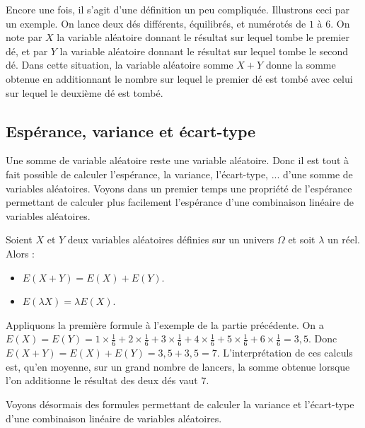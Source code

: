 	\begin{tip}[Exemple]
		Encore une fois, il s'agit d'une définition un peu compliquée. Illustrons ceci par un exemple.
		\newpar
		On lance deux dés différents, équilibrés, et numérotés de $1$ à $6$. On note par $X$ la variable aléatoire donnant le résultat sur lequel tombe le premier dé, et par $Y$ la variable aléatoire donnant le résultat sur lequel tombe le second dé.
		\newpar
		Dans cette situation, la variable aléatoire somme $X + Y$ donne la somme obtenue en additionnant le nombre sur lequel le premier dé est tombé avec celui sur lequel le deuxième dé est tombé.
	\end{tip}

	\subsection{Espérance, variance et écart-type}

	Une somme de variable aléatoire reste une variable aléatoire. Donc il est tout à fait possible de calculer l'espérance, la variance, l'écart-type, ... d'une somme de variables aléatoires.
	\newpar
	Voyons dans un premier temps une propriété de l'espérance permettant de calculer plus facilement l'espérance d'une combinaison linéaire de variables aléatoires.

	\begin{formula}
		Soient $X$ et $Y$ deux variables aléatoires définies sur un univers $\Omega$ et soit $\lambda$ un réel. Alors :
		\begin{itemize}
			\item $E(X + Y) = E(X) + E(Y)$.
			\item $E(\lambda X) = \lambda E(X)$.
		\end{itemize}
	\end{formula}

	\begin{tip}[Applications]
		Appliquons la première formule à l'exemple de la partie précédente.
		\newpar
		On a $E(X) = E(Y) = 1 \times \frac{1}{6} + 2 \times \frac{1}{6} + 3 \times \frac{1}{6} + 4 \times \frac{1}{6} + 5 \times \frac{1}{6} + 6 \times \frac{1}{6} = 3,5$.
		\newpar
		Donc $E(X+Y) = E(X) + E(Y) = 3,5 + 3,5 = 7$.
		\newpar
		L'interprétation de ces calculs est, qu'en moyenne, sur un grand nombre de lancers, la somme obtenue lorsque l'on additionne le résultat des deux dés vaut $7$.
	\end{tip}

	Voyons désormais des formules permettant de calculer la variance et l'écart-type d'une combinaison linéaire de variables aléatoires.

